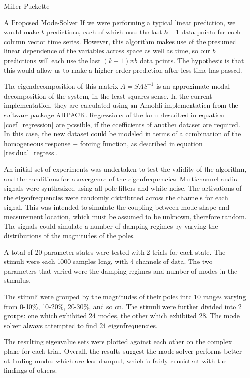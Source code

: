 \documentclass[a4paper,10pt]{report}
\numberwithin{equation}{section}
\begin{document}
\begin{chapter}{Miller Puckette}
\begin{section}{A Proposed Mode-Solver}
If we were performing a typical linear prediction, we would make $b$ predictions, each of which uses the last $k-1$ data points for each column vector time series. However, this algorithm makes use of the presumed linear dependence of the variables across space as well as time, so our $b$ predictions will each use the last $(k-1) wb$ data points. The hypothesis is that this would allow us to make a higher order prediction after less time has passed. 

The eigendecomposition of this matrix $A = S\Lambda S^{-1}$ is an approximate modal decomposition of the system, in the least squares sense. In the current implementation, they are calculated using an Arnoldi implementation from the software package ARPACK. Regressions of the form described in equation \eqref{coef_regression} are possible, if the coefficients of another dataset are required. In this case, the new dataset could be modeled in terms of a combination of the homogeneous response + forcing function, as described in equation \eqref{residual_regress}. 

An initial set of experiments was undertaken to test the validity of the algorithm, and the conditions for convergence of the eigenfrequencies. Multichannel audio signals were synthesized using all-pole filters and white noise. The activations of the eigenfrequencies were randomly distributed across the channels for each signal. This was intended to simulate the coupling between mode shape and measurement location, which must be assumed to be unknown, therefore random. The signals could simulate a number of damping regimes by varying the distributions of the magnitudes of the poles. 

A total of 20 parameter states were tested with 2 trials for each state. The stimuli were each 1000 samples long, with 4 channels of data. The two parameters that varied were the damping regimes and number of modes in the stimulus. 

The stimuli were grouped by the magnitudes of their poles into 10 ranges varying from 0-10\%, 10-20\%, 20-30\%, and so on. The stimuli were further divided into 2 groups: one which exhibited 24 modes, the other which exhibited 28. The mode solver always attempted to find 24 eigenfrequencies.

The resulting eigenvalue sets were plotted against each other on the complex plane for each trial. Overall, the results suggest the mode solver performs better at finding modes which are less damped, which is fairly consistent with the findings of others. \cite{Chen2012} \cite{Feeny1998} \cite{Kerschen2002} \cite{Han2003} 




\end{section}
\end{chapter}
\end{document}
